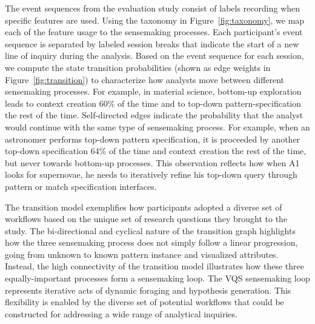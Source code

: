 \par The event sequences from the evaluation study consist of labels recording when specific features are used. Using the taxonomy in Figure~\ref{fig:taxonomy}, we map each of the feature usage to the sensemaking processes. Each participant's event sequence is separated by labeled session breaks that indicate the start of a new line of inquiry during the analysis. Based on the event sequence for each session, we compute the state transition probabilities (shown as edge weights in Figure~\ref{fig:transition}) to characterize how analysts move between different sensemaking processes.%
For example, in material science, bottom-up exploration leads to context creation 60\% of the time and to top-down pattern-specification the rest of the time. Self-directed edges indicate the probability that the analyst would continue with the same type of sensemaking process.%
For example, when an astronomer performs top-down pattern specification, it is proceeded by another top-down specification 64\% of the time and context creation the rest of the time, but never towards bottom-up processes. This observation reflects how when A1 looks for supernovae, he needs to iteratively refine his top-down query through pattern or match specification interfaces. %
\par The transition model exemplifies how participants adopted a diverse set of workflows based on the unique set of research questions they brought to the study. The bi-directional and cyclical nature of the transition graph highlights how the three sensemaking process does not simply follow a linear progression, going from unknown to known pattern instance and visualized attributes. Instead, the high connectivity of the transition model illustrates how these three equally-important processes form a sensemaking loop. The VQS sensemaking loop represents iterative acts of dynamic foraging and hypothesis generation. This flexibility is enabled by the diverse set of potential workflows that could be constructed for addressing a wide range of analytical inquiries.%

